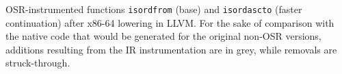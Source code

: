 \label{fig:isordx86-64} OSR-instrumented functions {\tt isordfrom} (base) and {\tt isordascto} (faster continuation) after x86-64 lowering in LLVM. For the sake of comparison with the native code that would be generated for the original non-OSR versions, additions resulting from the IR instrumentation are in grey, while removals are struck-through.